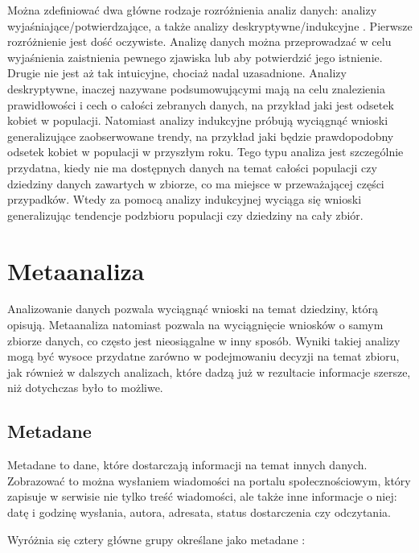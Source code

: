 	Można zdefiniować dwa główne rodzaje rozróżnienia analiz danych: analizy wyjaśniające/potwierdzające, a także analizy deskryptywne/indukcyjne \cite{berthold2003intelligent}.
	Pierwsze rozróżnienie jest dość oczywiste.
	Analizę danych można przeprowadzać w celu wyjaśnienia zaistnienia pewnego zjawiska lub aby potwierdzić jego istnienie.
	Drugie nie jest aż tak intuicyjne, chociaż nadal uzasadnione.
	Analizy deskryptywne, inaczej nazywane podsumowującymi mają na celu znalezienia prawidłowości i cech o całości zebranych danych, na przykład jaki jest odsetek kobiet w populacji.
	Natomiast analizy indukcyjne próbują wyciągnąć wnioski generalizujące zaobserwowane trendy, na przykład jaki będzie prawdopodobny odsetek kobiet w populacji w przyszłym roku.
	Tego typu analiza jest szczególnie przydatna, kiedy nie ma dostępnych danych na temat całości populacji czy dziedziny danych zawartych w zbiorze, co ma miejsce w przeważającej części przypadków.
	Wtedy za pomocą analizy indukcyjnej wyciąga się wnioski generalizując tendencje podzbioru populacji czy dziedziny na cały zbiór.

\section{Metaanaliza}

	Analizowanie danych pozwala wyciągnąć wnioski na temat dziedziny, którą opisują.
	Metaanaliza natomiast pozwala na wyciągnięcie wniosków o samym zbiorze danych, co często jest nieosiągalne w inny sposób.
	Wyniki takiej analizy mogą być wysoce przydatne zarówno w podejmowaniu decyzji na temat zbioru, jak również w dalszych analizach, które dadzą już w rezultacie informacje szersze, niż dotychczas było to możliwe.

	\subsection{Metadane}

	Metadane to dane, które dostarczają informacji na temat innych danych.
	Zobrazować to można wysłaniem wiadomości na portalu społecznościowym, który zapisuje w serwisie nie tylko treść wiadomości, ale także inne informacje o niej: datę i godzinę wysłania, autora, adresata, status dostarczenia czy odczytania.

	Wyróżnia się cztery główne grupy określane jako metadane \cite{riley2017understanding}:

